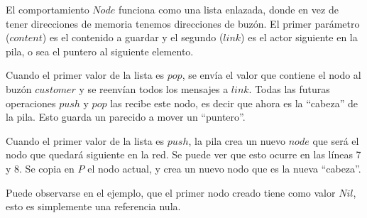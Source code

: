 El comportamiento $Node$ funciona como una lista enlazada, donde en vez de tener direcciones de memoria tenemos direcciones de buzón. El primer parámetro ($content$) es el contenido a guardar y el segundo ($link$) es el actor siguiente en la pila, o sea el puntero al siguiente elemento.

Cuando el primer valor de la lista es $pop$, se envía el valor que contiene el nodo al buzón $customer$ y se reenvían todos los mensajes a $link$. Todas las futuras operaciones $push$ y $pop$ las recibe este nodo, es decir que ahora es la ``cabeza'' de la pila. Esto guarda un parecido a mover un ``puntero''.

Cuando el primer valor de la lista es $push$, la pila crea un nuevo $node$ que será el nodo que quedará siguiente en la red. Se puede ver que esto ocurre en las líneas 7 y 8. Se copia en $P$ el nodo actual, y crea un nuevo nodo que es la nueva ``cabeza''.

Puede observarse en el ejemplo, que el primer nodo creado tiene como valor $Nil$, esto es simplemente una referencia nula. 

